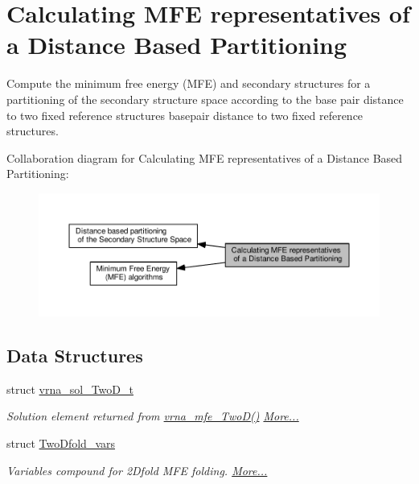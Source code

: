 \hypertarget{group__kl__neighborhood__mfe}{}\section{Calculating M\+FE representatives of a Distance Based Partitioning}
\label{group__kl__neighborhood__mfe}


Compute the minimum free energy (M\+FE) and secondary structures for a partitioning of the secondary structure space according to the base pair distance to two fixed reference structures basepair distance to two fixed reference structures.  


Collaboration diagram for Calculating M\+FE representatives of a Distance Based Partitioning\+:
\nopagebreak
\begin{figure}[H]
\begin{center}
\leavevmode
\includegraphics[width=350pt]{group__kl__neighborhood__mfe}
\end{center}
\end{figure}
\subsection*{Data Structures}
\begin{DoxyCompactItemize}
\item 
struct \hyperlink{group__kl__neighborhood__mfe_structvrna__sol__TwoD__t}{vrna\+\_\+sol\+\_\+\+Two\+D\+\_\+t}
\begin{DoxyCompactList}\small\item\em Solution element returned from \hyperlink{group__kl__neighborhood__mfe_ga243c288b463147352829df04de6a2f77}{vrna\+\_\+mfe\+\_\+\+Two\+D()}  \hyperlink{group__kl__neighborhood__mfe_structvrna__sol__TwoD__t}{More...}\end{DoxyCompactList}\item 
struct \hyperlink{group__kl__neighborhood__mfe_structTwoDfold__vars}{Two\+Dfold\+\_\+vars}
\begin{DoxyCompactList}\small\item\em Variables compound for 2\+Dfold M\+FE folding.  \hyperlink{group__kl__neighborhood__mfe_structTwoDfold__vars}{More...}\end{DoxyCompactList}\end{DoxyCompactItemize}
